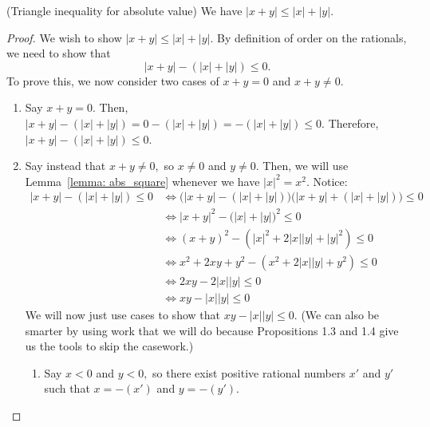 \begin{proposition}
    (Triangle inequality for absolute value) We have $\lvert x + y \rvert \leq \lvert x \rvert + \lvert y \rvert.$
\end{proposition}
\begin{proof}
    We wish to show $\lvert x + y \rvert \leq \lvert x \rvert + \lvert y \rvert.$ 
    By definition of order on the rationals, we need to show that 
    $$\lvert x + y \rvert - (\lvert x \rvert + \lvert y \rvert) \leq  0.$$
    To prove this, we now consider two cases of $x + y = 0$ and $x + y \neq 0.$
    \begin{enumerate}
        \item Say $x + y = 0.$ Then, $\lvert x + y \rvert - (\lvert x \rvert + \lvert y \rvert) = 0 - (\lvert x \rvert + \lvert y \rvert) = - (\lvert x \rvert + \lvert y \rvert) \leq 0.$
        Therefore, $\lvert x + y \rvert - (\lvert x \rvert + \lvert y \rvert) \leq 0.$
        \item Say instead that $x + y \neq 0,$ so $x \neq 0$ and $y \neq 0.$ 
        Then, we will use Lemma~\ref{lemma: abs_square} whenever we have $\lvert x \rvert ^2 = x^2.$ Notice:
        \begin{align*}
            \lvert x + y \rvert - (\lvert x \rvert + \lvert y \rvert) \leq 0  &\iff \big( \lvert x + y \rvert - (\lvert x \rvert + \lvert y \rvert) \big) \big( \lvert x + y\rvert + (\lvert x \rvert + \lvert y \rvert) \big) \leq 0 \\
            &\iff \lvert x + y \rvert ^2 - \big(\lvert x \rvert + \lvert y \rvert \big)^2 \leq 0 \\
            &\iff (x + y)^2 - (\lvert x \rvert ^2 + 2 \lvert x \rvert  \lvert y \rvert + \lvert y \rvert ^2) \leq 0 \\
            &\iff x^2 + 2xy + y^2 - (x^2 + 2 \lvert x \rvert  \lvert y \rvert + y^2) \leq 0 \\
            &\iff 2xy - 2 \lvert x \rvert \lvert y \rvert \leq 0 \\
            &\iff xy - \lvert x \rvert \lvert y \rvert \leq  0
        \end{align*}
    We will now just use cases to show that $xy - \lvert x \rvert \lvert y \rvert \leq 0.$ 
    (We can also be smarter by using work that we will do because Propositions 1.3 and 1.4 give us the tools to skip the casework.)
    \begin{enumerate}
        \item Say $x < 0$ and $ y < 0,$ so there exist positive rational numbers $x'$ and $y'$ such that $x = -(x')$ and $y = -(y').$

\end{enumerate}
\end{enumerate}
\end{proof}

